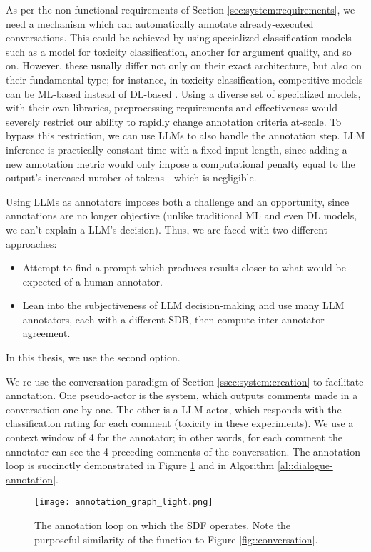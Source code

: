 As per the non-functional requirements of Section \ref{sec:system:requirements}, we need a mechanism which can automatically annotate already-executed conversations. This could be achieved by using specialized classification models such as a model for toxicity classification, another for argument quality, and so on. However, these usually differ not only on their exact architecture, but also on their fundamental type; for instance, in toxicity classification, competitive models can be ML-based instead of DL-based \cite{anjum2024hate}. Using a diverse set of specialized models, with their own libraries, preprocessing requirements and effectiveness would severely restrict our ability to rapidly change annotation criteria at-scale. To bypass this restriction, we can use LLMs to also handle the annotation step. LLM inference is practically constant-time with a fixed input length, since adding a new annotation metric would only impose a computational penalty equal to the output's increased number of tokens - which is negligible. 

Using LLMs as annotators imposes both a challenge and an opportunity, since annotations are no longer objective (unlike traditional ML and even DL models, we can't explain a LLM's decision). Thus, we are faced with two different approaches:

\begin{itemize}
	\item Attempt to find a prompt which produces results closer to what would be expected of a human annotator.
	\item Lean into the subjectiveness of LLM decision-making and use many LLM annotators, each with a different \ac{SDB}, then compute inter-annotator agreement.
\end{itemize}

In this thesis, we use the second option.

We re-use the conversation paradigm of Section \ref{ssec:system:creation} to facilitate annotation. One pseudo-actor is the system, which outputs comments made in a conversation one-by-one. The other is a LLM actor, which responds with the classification rating for each comment (toxicity in these experiments).  We use a context window of 4 for the annotator; in other words, for each comment the annotator can see the 4 preceding comments of the conversation. The annotation loop is succinctly demonstrated in Figure \ref{fig::annotation} and in Algorithm \ref{al::dialogue-annotation}.

\begin{figure}
	\centering
	\texttt{[image: annotation\_graph\_light.png]}
	\caption{The annotation loop on which the \ac{SDF} operates. Note the purposeful similarity of the function to Figure \ref{fig::conversation}.}
	\label{fig::annotation}
\end{figure}

